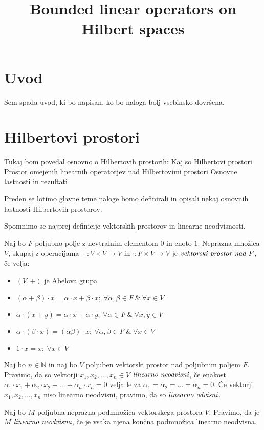 \documentclass[mat2]{matdelo}
\title{Bounded linear operators on Hilbert spaces}
\newcommand{\N}{\mathbb{N}}
\newcommand{\pojem}[1]{\ensuremath{\emph{#1}}}
\newcommand{\map}[3]{\ensuremath{{#1}:{#2}\rightarrow{#3}}}
\begin{document}
	
	\tableofcontents
	
	\section{Uvod}\label{sect:intro}
	Sem spada uvod, ki bo napisan, ko bo naloga bolj vsebinsko dovršena.
	
	\section{Hilbertovi prostori}
		Tukaj bom povedal osnovno o Hilbertovih prostorih:
		Kaj so Hilbertovi prostori
		Prostor omejenih linearnih operatorjev nad Hilbertovimi prostori
		Osnovne lastnosti in rezultati
		
		Preden se lotimo glavne teme naloge bomo definirali in opisali nekaj osnovnih lastnosti Hilbertovih prostorov. 
		
		Spomnimo se najprej definicije vektorskih prostorov in linearne neodvisnosti.
		
		\begin{definicija}
			\label{def:VektSpac}
			Naj bo $F$ poljubno polje z nevtralnim elementom $0$ in enoto $1$. Neprazna množica $V$, skupaj z operacijama $\map{+}{V\times V}{V}$ in $\map{\cdot}{F\times V}{V}$ je \pojem{vektorski prostor nad $F$}, če velja: \begin{itemize}
				\item $(V, +)$ je Abelova grupa
				\item $(\alpha + \beta)\cdot x = \alpha\cdot x + \beta\cdot x;~\forall \alpha, \beta \in F~\&~\forall x\in V$
				\item $\alpha\cdot(x+y) = \alpha\cdot x + \alpha\cdot y;~\forall \alpha\in F~\&~\forall x, y\in V$
				\item $\alpha\cdot(\beta\cdot x) = (\alpha\beta)\cdot x;~\forall \alpha, \beta\in F~\&~\forall x\in V$
				\item $1\cdot x = x;~\forall x\in V$
			\end{itemize}
		\end{definicija}
		
		\begin{definicija}
			\label{def:LinNeodv}
			Naj bo $n\in\N$ in naj bo $V$ poljuben vektorski prostor nad poljubnim poljem $F$. Pravimo, da so vektorji $x_1, x_2, \ldots, x_n \in V$ \pojem{linearno neodvisni}, če enakost $\alpha_1\cdot x_1 + \alpha_2\cdot x_2 + \ldots + \alpha_n\cdot x_n = 0 $ velja le za $\alpha_1 = \alpha_2 = \ldots = \alpha_n = 0$.
			Če vektorji $x_1, x_2, \ldots, x_n$ niso linearno neodvisni, pravimo, da so \pojem{linearno odvisni}.
			
			Naj bo $M$ poljubna neprazna podmnožica vektorskega prostora $V$. Pravimo, da je $M$ \pojem{linearno neodvisna}, če je vsaka njena končna podmnožica linearno neodvisna.
		\end{definicija}
		
\end{document}
